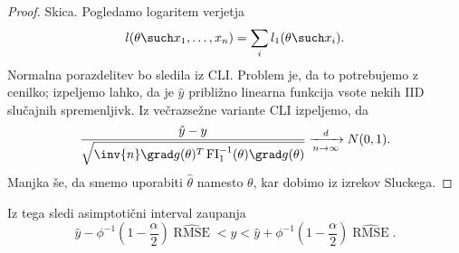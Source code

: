 \begin{proof}
  Skica.
  Pogledamo logaritem verjetja
  \[
	l(\theta \such x_1, \ldots, x_n)
	= \sum_i l_1(\theta \such x_i).
  \]
  Normalna porazdelitev bo sledila iz CLI.
  Problem je, da to potrebujemo z cenilko; izpeljemo lahko, da je $\hat{y}$
  približno linearna funkcija vsote nekih IID slučajnih spremenljivk.
  Iz večrazsežne variante CLI izpeljemo, da
  \[
	\frac{\hat{y} - y}{\sqrt{\inv{n} \grad g(\theta)^T
		\operatorname{FI}_1^{-1}(\theta) \grad g(\theta)}}
	\xrightarrow[n \to \infty]{d} N(0,1).
  \]
  Manjka še, da smemo uporabiti $\hat{\theta}$ namesto $\theta$, kar dobimo iz
  izrekov Sluckega.
\end{proof}

Iz tega sledi asimptotični interval zaupanja
\[
  \hat{y} - \phi^{-1}(1 - \frac{\alpha}{2}) \widehat{\operatorname{RMSE}}
  < y
  < \hat{y} + \phi^{-1}(1 - \frac{\alpha}{2}) \widehat{\operatorname{RMSE}}.
\]


